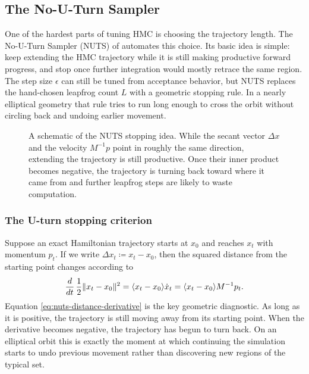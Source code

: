 \subsection{The No-U-Turn Sampler}
\label{subsec:nuts}

One of the hardest parts of tuning HMC is choosing the trajectory length.
The No-U-Turn Sampler (NUTS) of \citet[\S3.1]{hoffman_gelman_2014_nuts} automates this choice.
Its basic idea is simple: keep extending the HMC trajectory while it is still making productive forward progress, and stop once further integration would mostly retrace the same region.
The step size $\epsilon$ can still be tuned from acceptance behavior, but NUTS replaces the hand-chosen leapfrog count $L$ with a geometric stopping rule.
In a nearly elliptical geometry that rule tries to run long enough to cross the orbit without circling back and undoing earlier movement.

\begin{figure}[H]
  \centering
  
  \caption{A schematic of the NUTS stopping idea.
  While the secant vector $\Delta x$ and the velocity $M^{-1}p$ point in roughly the same direction, extending the trajectory is still productive.
  Once their inner product becomes negative, the trajectory is turning back toward where it came from and further leapfrog steps are likely to waste computation.}
  \label{fig:nuts-uturn}
\end{figure}

\subsubsection{The U-turn stopping criterion}
\label{subsubsec:nuts-uturn}

Suppose an exact Hamiltonian trajectory starts at $x_0$ and reaches $x_t$ with momentum $p_t$.
If we write $\Delta x_t \coloneqq x_t-x_0$, then the squared distance from the starting point changes according to
\begin{equation}
  \frac{d}{dt}\,\frac{1}{2}\lVert x_t-x_0\rVert^2
  =
  \langle x_t-x_0\rangle{\dot x_t}
  =
  \langle x_t-x_0\rangle{M^{-1}p_t}.
  \label{eq:nuts-distance-derivative}
\end{equation}
Equation \eqref{eq:nuts-distance-derivative} is the key geometric diagnostic.
As long as it is positive, the trajectory is still moving away from its starting point.
When the derivative becomes negative, the trajectory has begun to turn back.
On an elliptical orbit this is exactly the moment at which continuing the simulation starts to undo previous movement rather than discovering new regions of the typical set.

